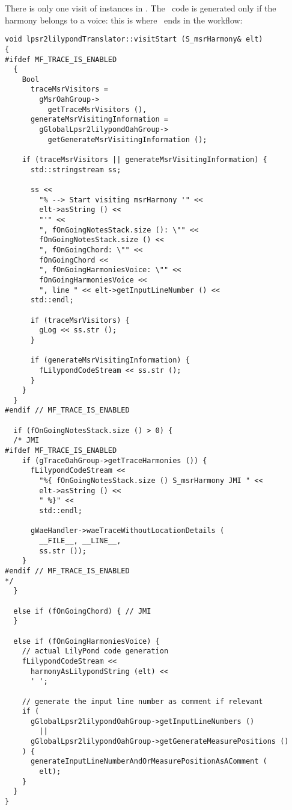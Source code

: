 There is only one visit of  instances in . The \lily\ code is generated only if the harmony belongs to a voice: this is where \denorm\ ends in the workflow:%
\begin{lstlisting}[language=CPlusPlus]
void lpsr2lilypondTranslator::visitStart (S_msrHarmony& elt)
{
#ifdef MF_TRACE_IS_ENABLED
  {
    Bool
      traceMsrVisitors =
        gMsrOahGroup->
          getTraceMsrVisitors (),
      generateMsrVisitingInformation =
        gGlobalLpsr2lilypondOahGroup->
          getGenerateMsrVisitingInformation ();

    if (traceMsrVisitors || generateMsrVisitingInformation) {
      std::stringstream ss;

      ss <<
        "% --> Start visiting msrHarmony '" <<
        elt->asString () <<
        "'" <<
        ", fOnGoingNotesStack.size (): \"" <<
        fOnGoingNotesStack.size () <<
        ", fOnGoingChord: \"" <<
        fOnGoingChord <<
        ", fOnGoingHarmoniesVoice: \"" <<
        fOnGoingHarmoniesVoice <<
        ", line " << elt->getInputLineNumber () <<
      std::endl;

      if (traceMsrVisitors) {
        gLog << ss.str ();
      }

      if (generateMsrVisitingInformation) {
        fLilypondCodeStream << ss.str ();
      }
    }
  }
#endif // MF_TRACE_IS_ENABLED

  if (fOnGoingNotesStack.size () > 0) {
  /* JMI
#ifdef MF_TRACE_IS_ENABLED
    if (gTraceOahGroup->getTraceHarmonies ()) {
      fLilypondCodeStream <<
        "%{ fOnGoingNotesStack.size () S_msrHarmony JMI " <<
        elt->asString () <<
        " %}" <<
        std::endl;

      gWaeHandler->waeTraceWithoutLocationDetails (
        __FILE__, __LINE__,
        ss.str ());
    }
#endif // MF_TRACE_IS_ENABLED
*/
  }

  else if (fOnGoingChord) { // JMI
  }

  else if (fOnGoingHarmoniesVoice) {
    // actual LilyPond code generation
    fLilypondCodeStream <<
      harmonyAsLilypondString (elt) <<
      ' ';

    // generate the input line number as comment if relevant
    if (
      gGlobalLpsr2lilypondOahGroup->getInputLineNumbers ()
        ||
      gGlobalLpsr2lilypondOahGroup->getGenerateMeasurePositions ()
    ) {
      generateInputLineNumberAndOrMeasurePositionAsAComment (
        elt);
    }
  }
}
\end{lstlisting}

